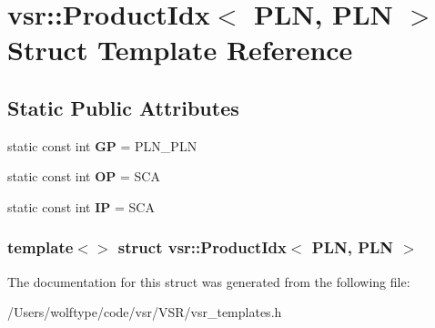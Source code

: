 \hypertarget{structvsr_1_1_product_idx_3_01_p_l_n_00_01_p_l_n_01_4}{\section{vsr\-:\-:Product\-Idx$<$ P\-L\-N, P\-L\-N $>$ Struct Template Reference}
\label{structvsr_1_1_product_idx_3_01_p_l_n_00_01_p_l_n_01_4}
}
\subsection*{Static Public Attributes}
\begin{DoxyCompactItemize}
\item 
\hypertarget{structvsr_1_1_product_idx_3_01_p_l_n_00_01_p_l_n_01_4_ad34d7a74949afd0c0959307bf95436c4}{static const int {\bfseries G\-P} = P\-L\-N\-\_\-\-P\-L\-N}\label{structvsr_1_1_product_idx_3_01_p_l_n_00_01_p_l_n_01_4_ad34d7a74949afd0c0959307bf95436c4}

\item 
\hypertarget{structvsr_1_1_product_idx_3_01_p_l_n_00_01_p_l_n_01_4_a79d8335bb4ece80462161987ac54d205}{static const int {\bfseries O\-P} = S\-C\-A}\label{structvsr_1_1_product_idx_3_01_p_l_n_00_01_p_l_n_01_4_a79d8335bb4ece80462161987ac54d205}

\item 
\hypertarget{structvsr_1_1_product_idx_3_01_p_l_n_00_01_p_l_n_01_4_a048cd01971417a7648b2c8032f67bd36}{static const int {\bfseries I\-P} = S\-C\-A}\label{structvsr_1_1_product_idx_3_01_p_l_n_00_01_p_l_n_01_4_a048cd01971417a7648b2c8032f67bd36}

\end{DoxyCompactItemize}
\subsubsection*{template$<$$>$ struct vsr\-::\-Product\-Idx$<$ P\-L\-N, P\-L\-N $>$}



The documentation for this struct was generated from the following file\-:\begin{DoxyCompactItemize}
\item 
/\-Users/wolftype/code/vsr/\-V\-S\-R/vsr\-\_\-templates.\-h\end{DoxyCompactItemize}
